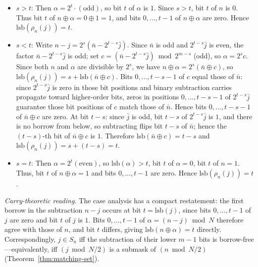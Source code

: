 \documentclass[10pt,a4paper]{amsart}
\begin{document}
\begin{itemize}
\item $s > t$: Then $\alpha = 2^t \cdot (\text{odd})$, so bit $t$ of $\alpha$ is $1$. Since $s > t$, bit $t$ of $n$ is $0$. Thus bit $t$ of $n\oplus \alpha = 0\oplus 1 = 1$, and bits $0,\ldots,t-1$ of $n\oplus \alpha$ are zero. Hence $\mathrm{lsb}(\rho_n(j)) = t$.

\item $s < t$: Write $n - j = 2^s(\bar{n} - 2^{t-s}\bar{j})$. Since $\bar{n}$ is odd and $2^{t-s}\bar{j}$ is even, the factor $\bar{n} - 2^{t-s}\bar{j}$ is odd; set $c = (\bar{n} - 2^{t-s}\bar{j})\bmod 2^{m-s}$ (odd), so $\alpha = 2^s c$. Since both $n$ and $\alpha$ are divisible by $2^s$, we have $n\oplus \alpha = 2^s(\bar{n}\oplus c)$, so $\mathrm{lsb}(\rho_n(j)) = s + \mathrm{lsb}(\bar{n}\oplus c)$. Bits $0,\ldots,t-s-1$ of $c$ equal those of $\bar{n}$: since $2^{t-s}\bar{j}$ is zero in those bit positions and binary subtraction carries propagate toward higher-order bits, zeros in positions $0,\ldots,t-s-1$ of $2^{t-s}\bar{j}$ guarantee those bit positions of $c$ match those of $\bar{n}$. Hence bits $0,\ldots,t-s-1$ of $\bar{n}\oplus c$ are zero. At bit $t-s$: since $\bar{j}$ is odd, bit $t-s$ of $2^{t-s}\bar{j}$ is $1$, and there is no borrow from below, so subtracting flips bit $t-s$ of $\bar{n}$; hence the $(t-s)$-th bit of $\bar{n}\oplus c$ is $1$. Therefore $\mathrm{lsb}(\bar{n}\oplus c) = t-s$ and $\mathrm{lsb}(\rho_n(j)) = s+(t-s) = t$.

\item $s = t$: Then $\alpha = 2^t(\text{even})$, so $\mathrm{lsb}(\alpha) > t$, bit $t$ of $\alpha = 0$, bit $t$ of $n = 1$. Thus, bit $t$ of $n\oplus \alpha = 1$ and bits $0,\ldots,t-1$ are zero. Hence $\mathrm{lsb}(\rho_n(j)) = t$.
\end{itemize}

\smallskip
\emph{Carry-theoretic reading.} The case analysis has a compact restatement: the first borrow in the subtraction $n-j$ occurs at bit $t=\mathrm{lsb}(j)$, since bits $0,\ldots,t-1$ of $j$ are zero and bit $t$ of $j$ is $1$. Bits $0,\ldots,t-1$ of $\alpha=(n-j)\bmod N$ therefore agree with those of $n$, and bit $t$ differs, giving $\mathrm{lsb}(n\oplus \alpha)=t$ directly. Correspondingly, $j\in S_n$ iff the subtraction of their lower $m-1$ bits is borrow-free---equivalently, iff $(j\bmod N/2)$ is a submask of $(n\bmod N/2)$ (Theorem~\ref{thm:matching-set}).
\end{document}

